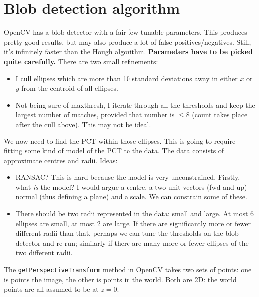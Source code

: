 \section{Blob detection algorithm}
OpenCV has a blob detector with a fair few tunable parameters. This produces pretty good results,
but may also produce a lot of false positives/negatives. Still, it's infinitely faster than the
Hough algorithm. \textbf{Parameters have to be picked quite carefully.} There are two small refinements:
\begin{itemize}
\item I cull ellipses which are more than 10 standard deviations away in either $x$ or $y$ from
the centroid of all ellipses.
\item Not being sure of maxthresh, I iterate through all the thresholds and keep the largest number of
matches, provided that number is $\le 8$ (count takes place after the cull above). This may not be ideal.
\end{itemize}


We now need to find the PCT within those ellipses. This is going to require fitting some kind of
model of the PCT to the data. The data consists of approximate centres and radii. 
Ideas:
\begin{itemize}
\item RANSAC? This is hard because the model is very unconstrained. Firstly, what \emph{is} the
model? I would argue a centre, a two unit vectors (fwd and up) normal (thus defining a plane) and a scale.
We can constrain some of these.
\item There should be two radii represented in the data: small and large. At most 6 ellipses are small, at most
2 are large. If there are significantly more or fewer different radii than that, perhaps we can tune the thresholds on the blob
detector and re-run; similarly if there are many more or fewer ellipses of the two different radii.
\end{itemize}
The \verb+getPerspectiveTransform+ method in OpenCV takes two sets of 
points: one is points the image, the other is points in the world. Both are 2D: the world points
are all assumed to be at $z=0$. 
